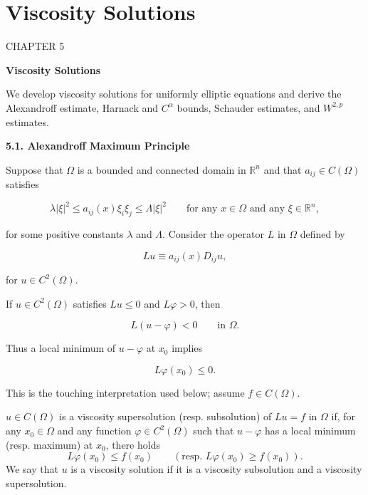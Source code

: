 \chapter{Viscosity Solutions}

\begin{center}
CHAPTER 5

\vspace{1em}

\Large \textbf{Viscosity Solutions}
\end{center}

We develop viscosity solutions for uniformly elliptic equations and derive the Alexandroff estimate, Harnack and $C^\alpha$ bounds, Schauder estimates, and $W^{2,p}$ estimates.

\vspace{1em}

\begin{center}
\textbf{5.1. Alexandroff Maximum Principle}
\end{center}

Suppose that $\Omega$ is a bounded and connected domain in $\mathbb{R}^n$ and that $a_{ij}\in C(\Omega)$ satisfies

\[
\lambda |\xi|^2 \le a_{ij}(x)\xi_i\xi_j \le \Lambda |\xi|^2 \qquad \text{for any } x\in \Omega \text{ and any } \xi\in\mathbb{R}^n,
\]

for some positive constants $\lambda$ and $\Lambda$. Consider the operator $L$ in $\Omega$ defined by

\[
Lu \equiv a_{ij}(x)D_{ij}u,
\]

for $u\in C^2(\Omega)$.

If $u\in C^2(\Omega)$ satisfies $Lu\le0$ and $L\varphi>0$, then

\[
L(u-\varphi) < 0 \qquad \text{in } \Omega.
\]

Thus a local minimum of $u-\varphi$ at $x_0$ implies

\[
L\varphi(x_0)\le 0.
\]

This is the touching interpretation used below; assume $f\in C(\Omega)$.



\begin{definition}\label{hanlin:ch05-def-5-1} $u \in C(\Omega)$ is a viscosity supersolution (resp. subsolution) of
$Lu = f$ in $\Omega$ if, for any $x_0 \in \Omega$ and any function $\varphi \in C^2(\Omega)$ such that $u - \varphi$ has a
local minimum (resp. maximum) at $x_0$, there holds
\[
L\varphi(x_0) \le f(x_0) \qquad (\text{resp. } L\varphi(x_0) \ge f(x_0)).
\]
We say that $u$ is a viscosity solution if it is a viscosity subsolution and a viscosity
supersolution.
\end{definition}

